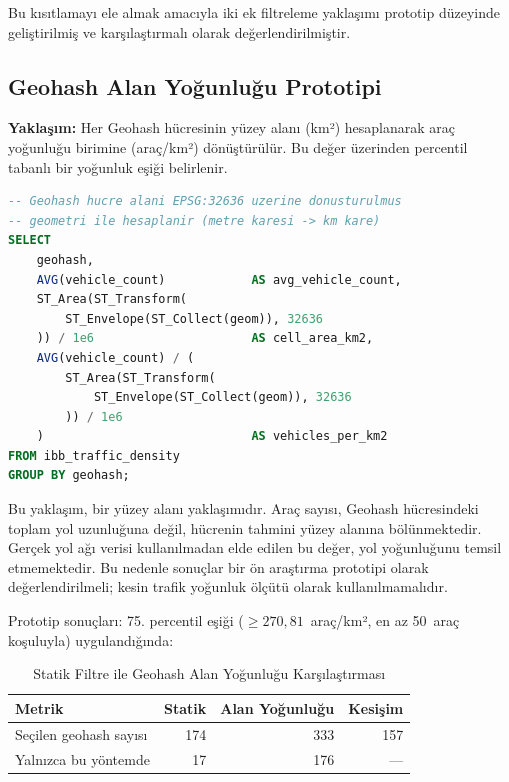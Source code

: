 \documentclass[12pt,a4paper]{article}
\begin{document}
Bu kısıtlamayı ele almak amacıyla iki ek filtreleme yaklaşımı prototip düzeyinde geliştirilmiş ve karşılaştırmalı olarak değerlendirilmiştir.

\subsection{Geohash Alan Yoğunluğu Prototipi}

\textbf{Yaklaşım:} Her Geohash hücresinin yüzey alanı (km²) hesaplanarak araç yoğunluğu birimine (araç/km²) dönüştürülür. Bu değer üzerinden percentil tabanlı bir yoğunluk eşiği belirlenir.

\begin{lstlisting}[language=SQL, caption={Geohash alan yoğunluğu hesaplama (prototip)}]
-- Geohash hucre alani EPSG:32636 uzerine donusturulmus
-- geometri ile hesaplanir (metre karesi -> km kare)
SELECT
    geohash,
    AVG(vehicle_count)            AS avg_vehicle_count,
    ST_Area(ST_Transform(
        ST_Envelope(ST_Collect(geom)), 32636
    )) / 1e6                      AS cell_area_km2,
    AVG(vehicle_count) / (
        ST_Area(ST_Transform(
            ST_Envelope(ST_Collect(geom)), 32636
        )) / 1e6
    )                             AS vehicles_per_km2
FROM ibb_traffic_density
GROUP BY geohash;
\end{lstlisting}

\begin{importantbox}[SINIRLILIK]
Bu yaklaşım, bir yüzey alanı yaklaşımıdır. Araç sayısı, Geohash hücresindeki toplam yol uzunluğuna değil, hücrenin tahmini yüzey alanına bölünmektedir. Gerçek yol ağı verisi kullanılmadan elde edilen bu değer, yol yoğunluğunu temsil etmemektedir. Bu nedenle sonuçlar bir ön araştırma prototipi olarak değerlendirilmeli; kesin trafik yoğunluk ölçütü olarak kullanılmamalıdır.
\end{importantbox}

Prototip sonuçları: 75. percentil eşiği ($\geq 270{,}81$~araç/km², en az 50~araç koşuluyla) uygulandığında:

\begin{table}[H]
\centering
\caption{Statik Filtre ile Geohash Alan Yoğunluğu Karşılaştırması}
\label{tab:density-comparison}
\begin{tabular}{l r r r}
\toprule
\textbf{Metrik} & \textbf{Statik} & \textbf{Alan Yoğunluğu} & \textbf{Kesişim} \\
\midrule
Seçilen geohash sayısı & 174 & 333 & 157 \\
Yalnızca bu yöntemde  & 17 & 176 & — \\
\bottomrule
\end{tabular}
\end{table}
\end{document}
